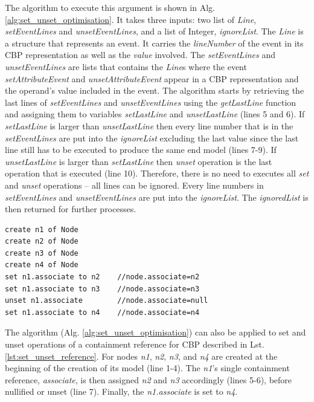 \documentclass[sigconf]{acmart}
\begin{document}
The algorithm to execute this argument is shown in Alg. \ref{alg:set_unset_optimisation}. It takes three inputs: two list of \emph{Line}, \emph{setEventLines} and \emph{unsetEventLines}, and a list of Integer, \emph{ignoreList}. The \emph{Line} is a structure that represents an event. It carries the \emph{lineNumber} of the event in its CBP representation as well as the \emph{value} involved. The \emph{setEventLines} and \emph{unsetEventLines} are lists that contains the \emph{Line}s where the event \emph{setAttributeEvent} and \emph{unsetAttributeEvent} appear in a CBP representation and the operand's value included in the event. The algorithm starts by retrieving the last lines of \emph{setEventLines} and \emph{unsetEventLines} using the \emph{getLastLine} function and assigning them to variables \emph{setLastLine} and \emph{unsetLastLine} (lines 5 and 6). If \emph{setLastLine} is larger than \emph{unsetLastLine} then every line number that is in the \emph{setEventLines} are put into the \emph{ignoreList} excluding the last value since the last line still has to be executed to produce the same end model (lines 7-9). If \emph{unsetLastLine} is larger than \emph{setLastLine} then \emph{unset} operation is the last operation that is executed (line 10). Therefore, there is no need to executes all \emph{set} and \emph{unset} operations -- all lines can be ignored. Every line numbers in \emph{setEventLines} and \emph{unsetEventLines} are put into the \emph{ignoreList}. The \emph{ignoredList} is then returned for further processes.

\begin{lstlisting}[style=eol,caption={Example of CBP representation of \emph{name} reference assignments.},label=lst:set_unset_reference]
create n1 of Node
create n2 of Node
create n3 of Node
create n4 of Node
set n1.associate to n2    //node.associate=n2
set n1.associate to n3    //node.associate=n3
unset n1.associate        //node.associate=null
set n1.associate to n4    //node.associate=n4
\end{lstlisting}

The algorithm (Alg. \ref{alg:set_unset_optimisation}) can also be applied to set and unset operations of a containment reference for CBP described in Lst. \ref{lst:set_unset_reference}. For nodes \emph{n1}, \emph{n2}, \emph{n3}, and \emph{n4} are created at the beginning of the creation of its model (line 1-4). The \emph{n1}'s single containment reference, \emph{associate}, is then assigned \emph{n2} and \emph{n3} accordingly (lines 5-6), before nullified or unset (line 7). Finally, the \emph{n1.associate} is set to \emph{n4}. 
\end{document}
